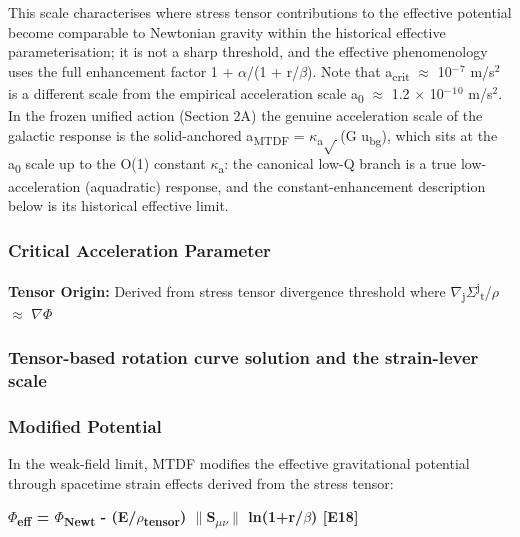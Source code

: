 \documentclass[11pt,a4paper]{article}
\begin{document}
This scale characterises where stress tensor contributions to the effective potential become comparable to Newtonian gravity within the historical effective parameterisation; it is not a sharp threshold, and the effective phenomenology uses the full enhancement factor 1 + $\alpha$/(1 + r/\allowbreak{}$\beta$). Note that a\textsubscript{crit} $\approx$ 10$^{-}$$^{7}$ m/\allowbreak{}s$^{2}$ is a different scale from the empirical acceleration scale a\textsubscript{0} $\approx$ 1.2 $\times$ 10$^{-}$$^{1}$$^{0}$ m/\allowbreak{}s$^{2}$. In the frozen unified action (Section 2A) the genuine acceleration scale of the galactic response is the solid-anchored a\textsubscript{MTDF} = $\kappa$\textsubscript{a}$\sqrt{\,}$(G u\textsubscript{bg}), which sits at the a\textsubscript{0} scale up to the O(1) constant $\kappa$\textsubscript{a}: the canonical low-Q branch is a true low-acceleration (aquadratic) response, and the constant-enhancement description below is its historical effective limit.

\begin{mdframed}[linecolor=accent,linewidth=0.5pt,backgroundcolor=callout-bg,leftline=true,rightline=true,topline=true,bottomline=true,innerleftmargin=8pt,innerrightmargin=8pt,innertopmargin=6pt,innerbottommargin=6pt]
\subsubsection{Critical Acceleration Parameter}
\textbf{Tensor Origin:} Derived from stress tensor divergence threshold where $\nabla$\textsubscript{j}$\Sigma$\textsuperscript{j}\textsubscript{t}/$\rho$ $\approx$ $\nabla$$\Phi$
\end{mdframed}

\subsubsection{Tensor-based rotation curve solution and the strain-lever scale}

\subsubsection{Modified Potential}
In the weak-field limit, MTDF modifies the effective gravitational potential through spacetime strain effects derived from the stress tensor:

\textbf{$\Phi$\textsubscript{eff} = $\Phi$\textsubscript{Newt} - (E/\allowbreak{}$\rho$\textsubscript{tensor}) $\|$S\textsubscript{$\mu$$\nu$}$\|$ ln(1+r/\allowbreak{}$\beta$) [E18]}
\end{document}
